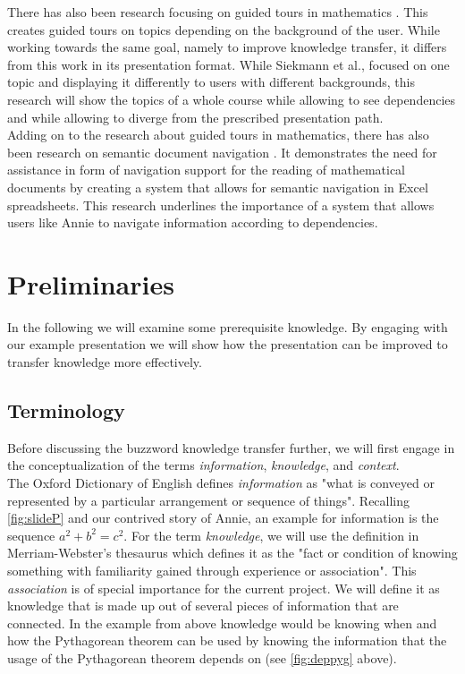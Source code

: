 \documentclass[twoside, 12pt]{article}
\begin{document}
There has also been research focusing on guided tours in mathematics \cite{SieBen:acgap00}. This creates guided tours on topics depending on the background of the user. While working towards the same goal, namely to improve knowledge transfer, it differs from this work in its presentation format. While Siekmann et al., focused on one topic and displaying it differently to users with different backgrounds, this research will show the topics of a whole course while allowing to see dependencies and while allowing to diverge from the prescribed presentation path.\\

Adding on to the research about guided tours in mathematics, there has also been research on semantic document navigation \cite{Koh:NavigationInMathDocs2012}. It demonstrates the need for assistance in form of navigation support for the reading of mathematical documents by creating a system that allows for semantic navigation in Excel spreadsheets. This research underlines the importance of a system that allows users like Annie to navigate information according to dependencies.
  
\section{Preliminaries}
\label{sec:preliminaries}

In the following we will examine some prerequisite knowledge. By engaging with our example presentation we will show how the presentation can be improved to transfer knowledge more effectively.

\subsection{Terminology}
\label{sec:terminology}

Before discussing the buzzword knowledge transfer further, we will first engage in the conceptualization of the terms \textit{information}, \textit{knowledge}, and \textit{context}.\\

The Oxford Dictionary of English \cite{OED:npentrel14} defines \textit{information} as "what is conveyed or represented by a particular arrangement or sequence of things". Recalling \autoref{fig:slideP} and our contrived story of Annie, an example for information is the sequence \textit{$a^2 + b^2 = c^2$}. For the term \textit{knowledge}, we will use the definition in Merriam-Webster's thesaurus \cite{Webster:npentrel14} which defines it as the "fact or condition of knowing something with familiarity gained through experience or association". This \textit{association} is of special importance for the current project. We will define it as knowledge that is made up out of several pieces of information that are connected. In the example from above knowledge would be knowing when and how the Pythagorean theorem can be used by knowing the information that the usage of the Pythagorean theorem depends on (see \autoref{fig:deppyg} above).\\ 
\end{document}
